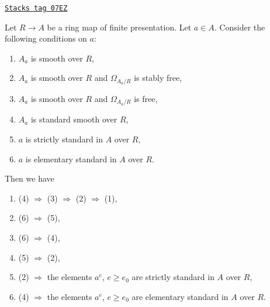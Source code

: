 \begin{lemma}
\label{smoothing-lemma-compare-standard}
\href{https://stacks.math.columbia.edu/tag/07EZ}{\texttt{Stacks tag 07EZ}}

Let $R \to A$ be a ring map of finite presentation.
Let $a \in A$. Consider the following conditions on $a$:
\begin{enumerate}
\item $A_a$ is smooth over $R$,
\item $A_a$ is smooth over $R$ and $\Omega_{A_a/R}$ is stably free,
\item $A_a$ is smooth over $R$ and $\Omega_{A_a/R}$ is free,
\item $A_a$ is standard smooth over $R$,
\item $a$ is strictly standard in $A$ over $R$,
\item $a$ is elementary standard in $A$ over $R$.
\end{enumerate}
Then we have
\begin{enumerate}
\item[(a)] (4) $\Rightarrow$ (3) $\Rightarrow$ (2) $\Rightarrow$ (1),
\item[(b)] (6) $\Rightarrow$ (5),
\item[(c)] (6) $\Rightarrow$ (4),
\item[(d)] (5) $\Rightarrow$ (2),
\item[(e)] (2) $\Rightarrow$ the elements $a^e$, $e \geq e_0$ are
strictly standard in $A$ over $R$,
\item[(f)] (4) $\Rightarrow$ the elements $a^e$, $e \geq e_0$ are
elementary standard in $A$ over $R$.
\end{enumerate}
\end{lemma}

